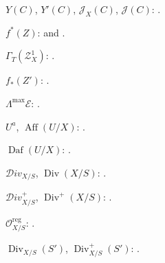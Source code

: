$Y(C)$, $Y'(C)$, $\mathcal J_X(C)$, $\mathcal J(C)$:
.

$f^*(Z)$:  and .

$\Gamma_T(\mathcal Z_X^1)$: .

$f_*(Z')$: .

$\Lambda^{\max}\mathcal E$: .

$U^a$, $\operatorname{Aff}(U/X)$: .

$\operatorname{Daf}(U/X)$: .

$\mathcal{D}iv_{X/S}$, $\operatorname{Div}(X/S)$:
.

$\mathcal{D}iv_{X/S}^+$, $\operatorname{Div}^+(X/S)$:
.

$\mathcal O_{X/S}^{\mathrm{reg}}$: .

$\operatorname{Div}_{X/S}(S')$, $\operatorname{Div}_{X/S}^+(S')$:
.

\endgroup
